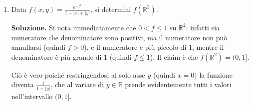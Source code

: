 \begin{enumerate}
	
	\item Data $f(x,y) = \frac{e^{-x^4}}{1 + |x| + |y|}$, si determini $f(\mathbb{R}^2)$.
	
	\textbf{Soluzione.}
		Si nota immediatamente che $0 < f \leq 1$ su $\mathbb{R}^2$: infatti sia numeratore che denominatore sono positivi, ma il numeratore non può annullarsi (quindi $f > 0$), e il numeratore è più piccolo di $1$, mentre il denominatore è più grande di $1$ (quindi $f \leq 1$). Il claim è che $f(\mathbb{R}^2) = (0,1]$.
		
		Ciò è vero poiché restringendosi al solo asse $y$ (quindi $x = 0$) la funzione diventa $\frac{1}{1 + |y|}$, che al variare di $y \in \mathbb{R}$ prende evidentemente tutti i valori nell'intervallo $(0,1]$.

\end{enumerate}